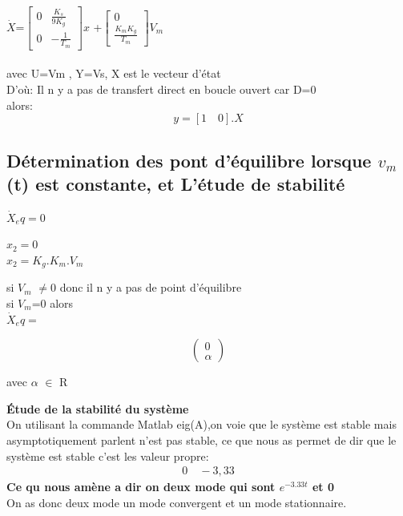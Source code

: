 $\dot{X}$=$\begin{bmatrix}0&\frac{K_s}{9K_g}\\0&-\frac{1}{T_m}\end{bmatrix}x$
\quad+\quad $\begin{bmatrix}0\\
\frac{K_mK_g}{T_m}
\end{bmatrix}V_m
$
\\\\

avec U=Vm , Y=Vs, X est le vecteur d'état\\
D'où: Il n y a  pas de transfert direct en boucle ouvert car D=0\\
alors: $$y=[1\quad0].X$$ 



\subsection{Détermination des pont d’équilibre lorsque $v_m$(t) est constante, et L’étude de stabilité }

\begin{center}
$\dot{X}_eq=0$
\end{center}

\begin{center}
$x_2=0 $\\
$x_2=K_g.K_m.V_m$ \\
\end{center}

\begin{center}
si $V_m$ $\ne $0 donc il n y a pas de point d'équilibre \\
si $V_m$=0 alors\\
 $\dot{X}_eq=$ \end{center}$$\begin{pmatrix} 0\\\alpha \end{pmatrix}$$
 
 \begin{center}
avec $\alpha$ $\in$ R
\end{center}

\textbf{Étude de la stabilité du système}\\
On utilisant  la commande Matlab eig(A),on voie que le système est stable mais asymptotiquement parlent n'est pas stable, ce que nous as permet de dir que le système  est stable c'est les valeur propre:  
$$\begin{matrix}
0\quad-3,33
\end{matrix}$$
\textbf{Ce qu nous amène a dir on deux mode qui sont $e^{-3.33t}$ et 0}\\
On as donc deux mode un mode  convergent et un mode stationnaire.\\

